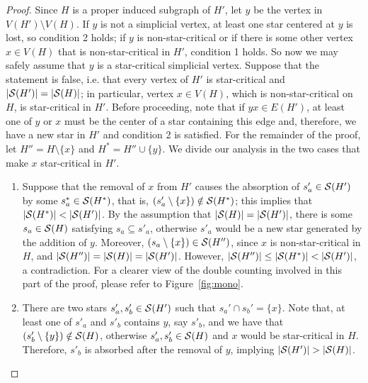 \begin{proof}
    Since $H$ is a proper induced subgraph of $H'$, let $y$ be the vertex in $V(H') \setminus V(H)$.
    If $y$ is not a simplicial vertex, at least one star centered at $y$ is lost, so condition 2 holds; if $y$ is non-star-critical or if there is some other vertex $x \in V(H)$ that is non-star-critical in $H'$, condition 1 holds.
    So now we may safely assume that $y$ is a star-critical simplicial vertex.
    Suppose that the statement is false, i.e. that every vertex of $H'$ is star-critical and $|\mathcal{S}(H')| = |\mathcal{S}(H)|$; in particular, vertex $x \in V(H)$, which is non-star-critical on $H$, is star-critical in $H'$.
    Before proceeding, note that if $yx \in E(H')$, at least one of $y$ or $x$ must be the center of a star containing this edge and, therefore, we have a new star in $H'$ and condition 2 is satisfied.
    For the remainder of the proof, let $H'' = H \setminus \{x\}$ and $H^* = H'' \cup \{y\}$.
    We divide our analysis in the two cases that make $x$ star-critical in $H'$.
    \begin{enumerate}
        \item Suppose that the removal of $x$ from $H'$ causes the absorption of $s'_a \in \mathcal{S}(H')$ by some $s^*_a \in \mathcal{S}(H^*)$, that is, $(s'_a \setminus \{x\}) \notin \mathcal{S}(H^*)$; this implies that $|\mathcal{S}(H^*)| < |\mathcal{S}(H')|$.
        By the assumption that $|\mathcal{S}(H)| = |\mathcal{S}(H')|$, there is some $s_a \in \mathcal{S}(H)$ satisfying $s_a \subseteq s'_a$, otherwise $s'_a$ would be a new star generated by the addition of $y$.
        Moreover, $(s_a \setminus \{x\}) \in \mathcal{S}(H'')$, since $x$ is non-star-critical in $H$, and $|\mathcal{S}(H'')| = |\mathcal{S}(H)| = |\mathcal{S}(H')|$.
        However, $|\mathcal{S}(H'')| \leq |\mathcal{S}(H^*)| < |\mathcal{S}(H')|$, a contradiction.
        For a clearer view of the double counting involved in this part of the proof, please refer to Figure~\ref{fig:mono}.
        \item There are two stars $s'_a, s'_b \in \mathcal{S}(H')$ such that $s_a' \cap s_b' = \{x\}$.
        Note that, at least one of $s'_a$ and $s'_b$ contains $y$, say $s'_b$, and we have that $(s'_b \setminus \{y\}) \notin \mathcal{S}(H)$, otherwise $s'_a,s'_b \in \mathcal{S}(H)$ and $x$ would be star-critical in $H$.
        Therefore, $s'_b$ is absorbed after the removal of $y$, implying $|\mathcal{S}(H')| > |\mathcal{S}(H)|$.
    \end{enumerate}
\end{proof}


